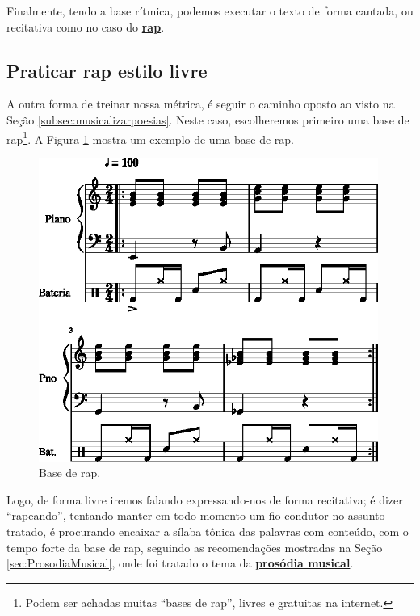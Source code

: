 Finalmente, tendo a base rítmica, podemos executar o texto de forma cantada,
ou recitativa como no caso do \hyperref[ref:RAP]{\textbf{rap}}.

\subsection{Praticar rap estilo livre}
\label{subsec:praticarrap}
A outra forma de treinar nossa métrica, 
é seguir o caminho oposto ao visto na Seção \ref{subsec:musicalizarpoesias}.
Neste caso, escolheremos primeiro uma base de rap\footnote{Podem ser achadas muitas ``bases de rap'',
livres e gratuitas na internet.}.
A Figura \ref{rap:base-rap} mostra um exemplo de uma base de rap.

\begin{figure}[h!]
\centering
    \centering
    \includegraphics[width=0.99\textwidth]{chapters/cap-musicalidade-tecnica/base-rap-1.eps}
\caption{Base de rap.}
\label{rap:base-rap}
\end{figure}


Logo, de forma livre iremos falando expressando-nos  de forma recitativa;
é dizer ``rapeando'', tentando manter em todo momento um fio condutor no assunto tratado,
é procurando encaixar a sílaba tônica das palavras com conteúdo,
com o tempo forte da base de rap, seguindo as recomendações mostradas na Seção \ref{sec:ProsodiaMusical},
onde foi tratado o tema da \hyperref[sec:ProsodiaMusical]{\textbf{prosódia musical}}.
